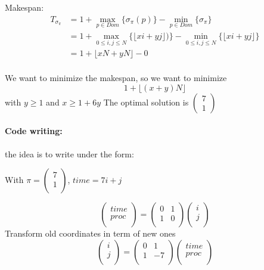 \documentclass{article}
\begin{document}
Makespan: 
\begin{align*}
T_{\sigma_\pi} &= 1 + \max_{p\in Dom} \{ \sigma_\pi (p)\} - \min_{p \in Dom} \{\sigma_\pi\}\\
&= 1 + \max_{0\leq i,j \leq N} \{ \lfloor xi+yj \rfloor)\} - \min_{0\leq i,j \leq N} \{\lfloor xi+yj \rfloor\}\\
&= 1 + \lfloor xN+yN\rfloor - 0\\
\end{align*}

We want to minimize the makespan, so we want to minimize
\[ 1 + \lfloor (x+y)N\rfloor \] with $y\geq 1$ and $x\geq 1 + 6y$
The optimal solution is $\begin{pmatrix}
7\\1
\end{pmatrix}$

\paragraph{Code writing:}the idea is to write under the form:
\begin{algorithm}
\end{algorithm}

With $\pi =\begin{pmatrix}
7\\1\\
\end{pmatrix}$, $time=7i+j$

\[\begin{pmatrix}
time\\
proc\\
\end{pmatrix}
=
\begin{pmatrix}
0&1\\1&0\\
\end{pmatrix}
\begin{pmatrix}
i\\j\\
\end{pmatrix}
\]
Transform old coordinates in term of new ones
\[
\begin{pmatrix}
i\\j\\
\end{pmatrix}
=
\begin{pmatrix}
0&1\\
1&-7\\
\end{pmatrix}
\begin{pmatrix}
time\\
proc\\
\end{pmatrix}
\]
\end{document}
